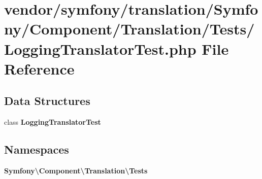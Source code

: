 \section{vendor/symfony/translation/\+Symfony/\+Component/\+Translation/\+Tests/\+Logging\+Translator\+Test.php File Reference}
\label{_logging_translator_test_8php}
\subsection*{Data Structures}
\begin{DoxyCompactItemize}
\item 
class {\bf Logging\+Translator\+Test}
\end{DoxyCompactItemize}
\subsection*{Namespaces}
\begin{DoxyCompactItemize}
\item 
 {\bf Symfony\textbackslash{}\+Component\textbackslash{}\+Translation\textbackslash{}\+Tests}
\end{DoxyCompactItemize}
